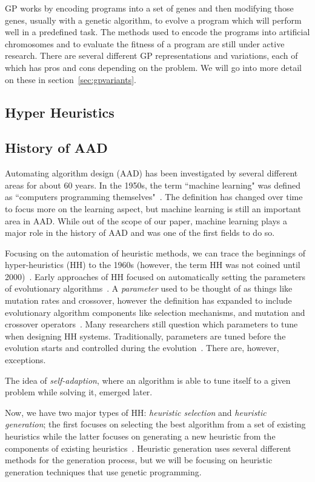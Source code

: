 \documentclass{sig-alternate}
\begin{document}
GP works by encoding programs into a set of genes and then modifying those genes, usually with a genetic algorithm, to evolve a program which will perform well in a predefined task. The methods used to encode the programs into artificial chromosomes and to evaluate the fitness of a program are still under active research. There are several different GP representations and variations, each of which has pros and cons depending on the problem. We will go into more detail on these in section~\ref{sec:gpvariants}.

\subsection{Hyper Heuristics}
\label{sec:HH}


\subsection{History of AAD}
\label{sec:history}
Automating algorithm design (AAD) has been investigated by several different areas for about 60 years. In the 1950s, the term ``machine learning" was defined as ``computers programming themselves"~\cite{pappa:2014}. The definition has changed over time to focus more on the learning aspect, but machine learning is still an important area in AAD. While out of the scope of our paper, machine learning plays a major role in the history of AAD and was one of the first fields to do so.

Focusing on the automation of heuristic methods, we can trace the beginnings of hyper-heuristics (HH) to the 1960s (however, the term HH was not coined until 2000)~\cite{pappa:2014}. Early approaches of HH focused on automatically setting the parameters of evolutionary algorithms~\cite{pappa:2014}. A \textit{parameter} used to be thought of as things like mutation rates and crossover, however the definition has expanded to include evolutionary algorithm components like selection mechanisms, and mutation and crossover operators~\cite{pappa:2014}. Many researchers still question which parameters to tune when designing HH systems. Traditionally, parameters are tuned before the evolution starts and controlled during the evolution~\cite{pappa:2014}. There are, however, exceptions.

The idea of \textit{self-adaption}, where an algorithm is able to tune itself to a given problem while solving it, emerged later.

Now, we have two major types of HH: \textit{heuristic selection} and \textit{heuristic generation}; the first focuses on selecting the best algorithm from a set of existing heuristics while the latter focuses on generating a new heuristic from the components of existing heuristics~\cite{pappa:2014}. Heuristic generation uses several different methods for the generation process, but we will be focusing on heuristic generation techniques that use genetic programming.
\end{document}
